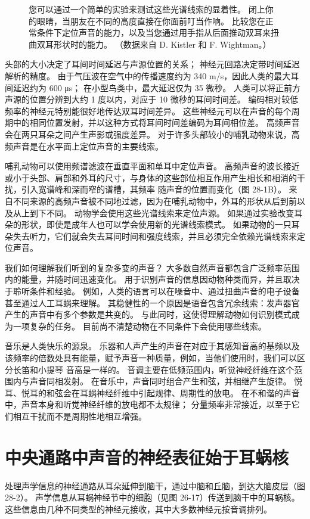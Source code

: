 \begin{figure}[htbp]
{	您可以通过一个简单的实验来测试这些光谱线索的显着性。 闭上你的眼睛，当朋友在不同的高度直接在你面前叮当作响。 比较您在正常条件下定位声音的能力，以及当您通过用手指从后面推动双耳来扭曲双耳形状时的能力。 （数据来自 D. Kistler 和 F. Wightman。）}
	\label{localizing}
\end{figure}

头部的大小决定了耳间时间延迟与声源位置的关系； 神经元回路决定带时间延迟解析的精度。 由于气压波在空气中的传播速度约为 340 m/s，因此人类的最大耳间延迟约为 600 μs； 在小型鸟类中，最大延迟仅为 35 微秒。 人类可以将正前方声源的位置分辨到大约 1 度以内，对应于 10 微秒的耳间时间差。 编码相对较低频率的神经元特别能很好地传达双耳时间差异。 这些神经元可以在声音的每个周期中的相同位置发射，并以这种方式将耳间时间差编码为耳间相位差。 高频声音会在两只耳朵之间产生声影或强度差异。 对于许多头部较小的哺乳动物来说，高频声音是在水平面上定位声音的主要线索。

哺乳动物可以使用频谱滤波在垂直平面和单耳中定位声音。 高频声音的波长接近或小于头部、肩部和外耳的尺寸，与身体的这些部位相互作用产生相长和相消的干扰，引入宽谱峰和深而窄的谱槽，其频率 随声音的位置而变化（图 28-1B）。 来自不同来源的高频声音被不同地过滤，因为在哺乳动物中，外耳的形状从后到前以及从上到下不同。 动物学会使用这些光谱线索来定位声源。 如果通过实验改变耳朵的形状，即使是成年人也可以学会使用新的光谱线索模式。 如果动物的一只耳朵失去听力，它们就会失去耳间时间和强度线索，并且必须完全依赖光谱线索来定位声音。

我们如何理解我们听到的复杂多变的声音？ 大多数自然声音都包含广泛频率范围内的能量，并随时间迅速变化。 用于识别声音的信息因动物种类而异，并且取决于聆听条件和经验。 例如，人类的语言可以在噪音中、通过扭曲声音的电子设备甚至通过人工耳蜗来理解。 其稳健性的一个原因是语音包含冗余线索：发声器官产生的声音中有多个参数是共变的。 与此同时，这使得理解动物如何识别模式成为一项复杂的任务。 目前尚不清楚动物在不同条件下会使用哪些线索。

音乐是人类快乐的源泉。 乐器和人声产生的声音在对应于其感知音高的基频以及该频率的倍数处具有能量，赋予声音一种质量，例如，当他们使用时，我们可以区分长笛和小提琴 音高是一样的。 音调主要在低频范围内，听觉神经纤维在这个范围内与声音同相发射。 在音乐中，声音同时组合产生和弦，并相继产生旋律。 悦耳、悦耳的和弦会在耳蜗神经纤维中引起规律、周期性的放电。 在不和谐的声音中，声音本身和听觉神经纤维的放电都不太规律； 分量频率非常接近，以至于它们相互干扰而不是周期性地相互增强。


\section{中央通路中声音的神经表征始于耳蜗核}
处理声学信息的神经通路从耳朵延伸到脑干，通过中脑和丘脑，到达大脑皮层（图 28-2）。 声学信息从耳蜗神经节中的细胞（见图 26-17）传送到脑干中的耳蜗核。 这些信息由几种不同类型的神经元接收，其中大多数神经元按音调排列。

